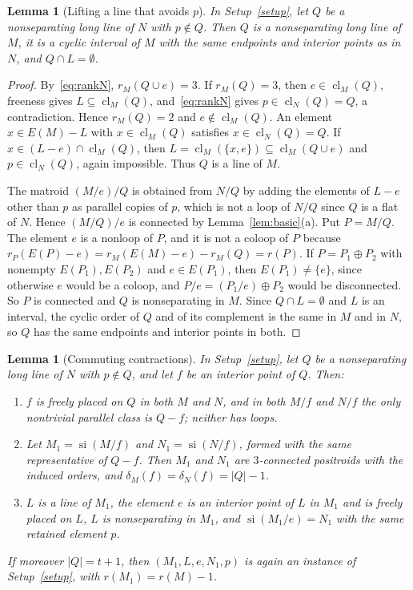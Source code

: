 \documentclass[11pt]{amsart}
\newtheorem{lemma}[theorem]{Lemma}
\theoremstyle{definition}
\theoremstyle{remark}
\numberwithin{equation}{section}
\newcommand{\cl}{\operatorname{cl}}
\newcommand{\si}{\operatorname{si}}
\begin{document}
\begin{lemma}[Lifting a line that avoids $p$]\label{lem:liftB}
In Setup~\textup{\ref{setup}}, let $Q$ be a nonseparating long line of $N$ with $p\notin Q$. Then $Q$ is a nonseparating long line of $M$, it is a cyclic interval of $M$ with the same endpoints and interior points as in $N$, and $Q\cap L=\emptyset$.
\end{lemma}

\begin{proof}
By~\eqref{eq:rankN}, $r_M(Q\cup e)=3$. If $r_M(Q)=3$, then $e\in\cl_M(Q)$, freeness gives $L\subseteq\cl_M(Q)$, and~\eqref{eq:rankN} gives $p\in\cl_N(Q)=Q$, a contradiction. Hence $r_M(Q)=2$ and $e\notin\cl_M(Q)$. An element $x\in E(M)-L$ with $x\in\cl_M(Q)$ satisfies $x\in\cl_N(Q)=Q$. If $x\in(L-e)\cap\cl_M(Q)$, then $L=\cl_M(\{x,e\})\subseteq\cl_M(Q\cup e)$ and $p\in\cl_N(Q)$, again impossible. Thus $Q$ is a line of $M$.

The matroid $(M/e)/Q$ is obtained from $N/Q$ by adding the elements of $L-e$ other than $p$ as parallel copies of $p$, which is not a loop of $N/Q$ since $Q$ is a flat of $N$. Hence $(M/Q)/e$ is connected by Lemma~\ref{lem:basic}(a). Put $P=M/Q$. The element $e$ is a nonloop of $P$, and it is not a coloop of $P$ because $r_P(E(P)-e)=r_M(E(M)-e)-r_M(Q)=r(P)$. If $P=P_1\oplus P_2$ with nonempty $E(P_1),E(P_2)$ and $e\in E(P_1)$, then $E(P_1)\ne\{e\}$, since otherwise $e$ would be a coloop, and $P/e=(P_1/e)\oplus P_2$ would be disconnected. So $P$ is connected and $Q$ is nonseparating in $M$. Since $Q\cap L=\emptyset$ and $L$ is an interval, the cyclic order of $Q$ and of its complement is the same in $M$ and in $N$, so $Q$ has the same endpoints and interior points in both.
\end{proof}

\begin{lemma}[Commuting contractions]\label{lem:liftC}
In Setup~\textup{\ref{setup}}, let $Q$ be a nonseparating long line of $N$ with $p\notin Q$, and let $f$ be an interior point of $Q$. Then:
\begin{enumerate}[label=\textup{(\arabic*)}]
\item $f$ is freely placed on $Q$ in both $M$ and $N$, and in both $M/f$ and $N/f$ the only nontrivial parallel class is $Q-f$; neither has loops.
\item Let $M_1=\si(M/f)$ and $N_1=\si(N/f)$, formed with the same representative of $Q-f$. Then $M_1$ and $N_1$ are $3$-connected positroids with the induced orders, and $\delta_M(f)=\delta_N(f)=|Q|-1$.
\item $L$ is a line of $M_1$, the element $e$ is an interior point of $L$ in $M_1$ and is freely placed on $L$, $L$ is nonseparating in $M_1$, and $\si(M_1/e)=N_1$ with the same retained element $p$.
\end{enumerate}
If moreover $|Q|=t+1$, then $(M_1,L,e,N_1,p)$ is again an instance of Setup~\textup{\ref{setup}}, with $r(M_1)=r(M)-1$.
\end{lemma}
\end{document}
